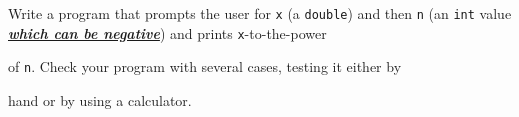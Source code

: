 Write a program that prompts the user for \texttt{x} (a \texttt{double}) and then \texttt{n} (an \texttt{int} value \underline{\textbf{\emph{which can be negative}}}) and prints \texttt{x}-to-the-power

of \texttt{n}. Check your program with several cases, testing it either by

hand or by using a calculator.

